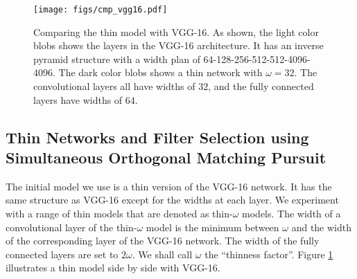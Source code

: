 \documentclass[10pt,twocolumn,letterpaper]{article}
\begin{document}
\begin{figure}[t]
	\begin{center}
		\texttt{[image: figs/cmp\_vgg16.pdf]}  
	\end{center}
	\caption{Comparing the thin model with VGG-16. As shown, the light color blobs shows the layers in the VGG-16 architecture. It has an inverse pyramid structure with a width plan of 64-128-256-512-512-4096-4096. The dark color blobs shows a thin network with $\omega=32$. The convolutional layers all have widths of $32$, and the fully connected layers have widths of $64$.}
	\label{fig:cmp_vgg16}
	\vspace{-2mm}
\end{figure}

\subsection{Thin Networks and Filter Selection using Simultaneous Orthogonal Matching Pursuit}
\label{sec:somp}
The initial model we use is a thin version of the VGG-16 network. It has the same structure as VGG-16 except for the widths at each layer. We experiment with a range of thin models that are denoted as thin-$\omega$ models. The width of a convolutional layer of the thin-$\omega$ model is the minimum between $\omega$ and the width of the corresponding layer of the VGG-16 network. The width of the fully connected layers are set to $2\omega$. We shall call $\omega$ the ``thinness factor''. Figure \ref{fig:cmp_vgg16} illustrates a thin model side by side with VGG-16. 
\end{document}
